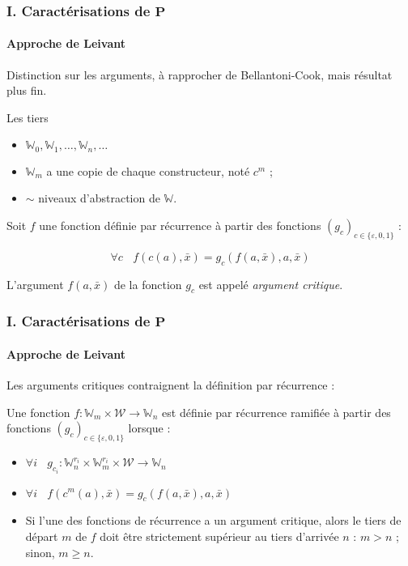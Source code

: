 \documentclass[10pt]{beamer}
\newcommand{\bbW}{\mathbb{W}}
\begin{document}
	\begin{frame}
		\frametitle{I. Caractérisations de $\textbf{P}$}
		\framesubtitle{Approche de Leivant}
		
		
		
		Distinction sur les arguments, à rapprocher de Bellantoni-Cook, mais résultat plus fin. 
		
		
		\begin{block}{Les tiers}
			\begin{itemize}
				\item 	$\bbW_0, \bbW_1, \dots, \bbW_n, \dots$
				\item 	$\bbW_m$ a une copie de chaque constructeur, noté $c^m$ ;
				\item 	$\sim$ niveaux d'abstraction de $\bbW$.
			\end{itemize}
		\end{block}
		
		
		\begin{defn}
			Soit $f$ une fonction définie par récurrence à partir des fonctions $\left( g_{c} \right)_{c \in \{\varepsilon, 0, 1\}}$ : 
			
			\[
				\forall c \:\:\:\: f(c(a), \bar{x})  = g_{c}\left( f(a, \bar{x}), a, \bar{x} \right)
			\]
			
			L'argument $f(a, \bar{x})$ de la fonction $g_{c}$ est appelé \emph{argument critique}.
		\end{defn}
	\end{frame}
	
	\begin{frame}
		\frametitle{I. Caractérisations de $\textbf{P}$}
		\framesubtitle{Approche de Leivant}
		
		Les arguments critiques contraignent la définition par récurrence :
		
		\begin{defn}
			Une fonction $f: \bbW_m \times \mathcal{W} \to \bbW_n$ est définie par récurrence ramifiée à partir des fonctions $\left( g_{c} \right)_{c \in \{\varepsilon, 0, 1\}}$ lorsque :
			
			\begin{itemize}
				\item 	$\forall i \:\:\:\: g_{c_i} : \bbW_n^{r_i} \times \bbW_m^{r_i} \times \mathcal{W} \to \bbW_n$
				
				\item 	$\forall i \:\:\:\:
				f(c^m(a), \bar{x}) 
				= g_{c}\left( f(a, \bar{x}), a, \bar{x} \right)
				$
				
				\item 	Si l'une des fonctions de récurrence a un argument critique, alors le tiers de départ $m$ de $f$ doit être strictement supérieur au tiers d'arrivée $n$ : $m > n$ ; sinon, $m \geqslant n$.
			\end{itemize}
		\end{defn}
	\end{frame}
	
\end{document}
